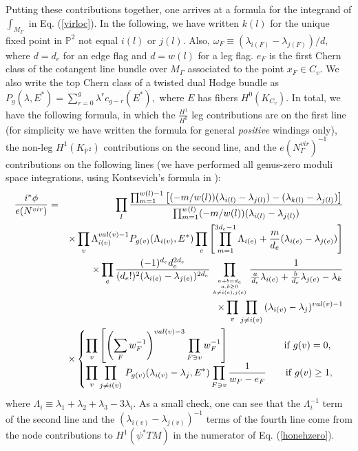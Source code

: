 \documentclass[a4paper,11pt]{article}
\newcommand{\PP}{{\mathbb{P}}}
\begin{document}
Putting these contributions
together, one arrives at a formula
for the integrand of $\int_{M_\Gamma}$ in Eq.\!\!\!
(\ref{virloc}).
In the following, we have written $k(l)$ for the
unique fixed point in $\PP^2$ not equal $i(l)$
or $j(l).$  Also, $\omega_F \equiv
(\lambda_{i(F)}-\lambda_{j(F)})/d,$ where
$d = d_e$ for an edge flag and $d = w(l)$
for a leg flag.  $e_F$ is the first Chern class
of the cotangent line bundle over $M_\Gamma$
associated to the point
$x_F \in C_v.$  We also write the top Chern
class of a twisted dual Hodge bundle as
$P_g(\lambda,E^*) = \sum_{r=0}^{g}\lambda^r c_{g-r}(E^*),$
where $E$ has fibers $H^0(K_{C_v}).$
In total, we have the following formula,
in which the $\frac{H^1}{H^0}$
leg contributions are on the
first line (for simplicity we have written the
formula for general {\sl positive} windings only),
the non-leg $H^1(K_{\PP^2})$ contributions
on the second line, and the $e(N^{vir}_\Gamma)^{-1}$
contributions on the following lines
(we have performed all genus-zero moduli space
integrations, using Kontsevich's formula in \cite{Kont}):
\begin{eqnarray*}
\label{virnorm}
\frac{i^*\phi}{e(N^{vir})} &=&
\prod_{l}
\frac{\prod_{m=1}^{w(l)-1}
\left[(-m/w(l))(\lambda_{i(l)}-\lambda_{j(l)})
-(\lambda_{k(l)}-\lambda_{j(l)})\right]}
{\prod_{m=1}^{w(l)}(-m/w(l))(\lambda_{i(l)}
-\lambda_{j(l)})}
\cr
&\phantom{=}&
\times
\prod_{v}\Lambda_{i(v)}^{val(v)-1}P_{g(v)}(\Lambda_{i(v)},E^*)
\prod_{e}\left[\prod_{m=1}^{3d_e - 1}\Lambda_{i(e)} +
\frac{m}{d_e}
(\lambda_{i(e)} -\lambda_{j(e)})\right]\\
&\phantom{=}&
\times
\prod_{e}\frac{(-1)^{d_e} d_e^{2 d_e}}{(d_e!)^2 
(\lambda_{i(e)}-\lambda_{j(e)})^{2 d_e}}
\prod_{{a+b=d_e\atop a,b\ge 0}\atop k\neq i(e),j(e)}
{\frac{1}{\frac{a}{d_e} \lambda_{i(e)}+\frac{b}{d_e}
\lambda_{j(e)}-\lambda_k}}\\
&\phantom{=}&\times \prod_{v} \prod_{j\neq i(v)} \, 
(\lambda_{i(v)}-\lambda_j)^{val(v)-1}\\
&\phantom{=}&
\times
\begin{cases}
\displaystyle
\prod_{v}
\left[\left(\sum_{F} w_F^{-1}\right)^{val(v)-3}\prod_{F\ni v}
w_F^{-1}\right]
\qquad\qquad\quad\;\;\, {\rm if }\; g(v)=0, \cr
\displaystyle
\prod_{v}
\prod_{j\neq i(v)} \,
P_{g(v)}(\lambda_{i(v)}-\lambda_j,E^*) 
\prod_{F\ni v} \frac{1}{w_F-e_F}
\qquad {\rm if}\; g(v)\ge 1,
\end{cases}
\end{eqnarray*}
where $\Lambda_i
\equiv\lambda_1 + \lambda_2 + \lambda_3 - 3 \lambda_i.$
As a small check, one can see that the $\Lambda_i^{-1}$
term of the second line and the $(\lambda_{i(v)}-
\lambda_{j(v)})^{-1}$ terms of the fourth line
come from the node contributions to $H^1(\psi^*TM)$
in the numerator of Eq.\!\!\! (\ref{honehzero}).
\end{document}

